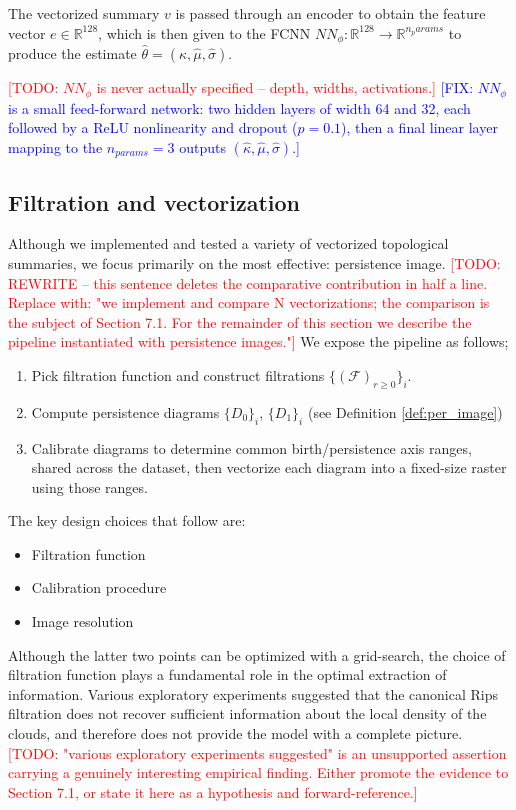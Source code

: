 \documentclass[11pt,letterpaper]{article}
\newcommand{\R}{\mathbb{R}}
\newcommand{\1}{\mathds{1}}
\newcommand{\filt}{\mathcal{F}}
\newcommand{\todo}[1]{\textcolor{red}{[TODO: #1]}}
\newcommand{\fix}[1]{\textcolor{blue}{[FIX: #1]}}
\newcommand{\todo}[1]{}
\newcommand{\fix}[1]{}
\theoremstyle{plain}
\theoremstyle{definitioncolon}
\begin{document}
The vectorized summary $v$ is passed through an encoder to obtain the
feature vector $e \in \R^{128}$, which is then given to the FCNN
$NN_\phi: \R^{128} \to \R^{n_params}$ to produce the estimate
$\hat\theta = (\hat\kappa, \hat\mu, \hat\sigma)$.

\todo{$NN_\phi$ is never actually specified -- depth, widths, activations.}
\fix{$NN_\phi$ is a small feed-forward network: two hidden layers of width 64 and 
32, each followed by a ReLU nonlinearity and dropout ($p=0.1$), then a final 
linear layer mapping to the $n_{params}=3$ outputs $(\hat\kappa, \hat\mu, \hat\sigma)$.}

\subsection{Filtration and vectorization}
Although we implemented and tested a variety of vectorized topological summaries,
we focus primarily on the most effective: persistence image.
\todo{REWRITE -- this sentence deletes the comparative contribution in half a
line. Replace with: "we implement and compare N vectorizations; the comparison
is the subject of Section 7.1. For the remainder of this section we describe the
pipeline instantiated with persistence images."}
We expose the pipeline as follows;
    \begin{enumerate}
        \item Pick filtration function and construct filtrations
        $\{(\filt)_{r\geq 0}\}_i$.
        \item Compute persistence diagrams $\{D_0\}_i$, $\{D_1\}_i$
        (see Definition \ref{def:per_image})
        \item Calibrate diagrams to determine common birth/persistence axis
        ranges, shared across the dataset, then vectorize each diagram into a
        fixed-size raster using those ranges.
    \end{enumerate}
The key design choices that follow are:
    \begin{itemize}
        \item Filtration function
        \item Calibration procedure
        \item Image resolution
    \end{itemize}
Although the latter two points can be optimized with a grid-search, the choice of
filtration function plays a fundamental role in the optimal extraction of
information. Various exploratory experiments suggested that the canonical Rips
filtration does not recover sufficient information about the local density of the
clouds, and therefore does not provide the model with a complete picture.
\todo{"various exploratory experiments suggested" is an unsupported assertion
carrying a genuinely interesting empirical finding. Either promote the evidence
to Section 7.1, or state it here as a hypothesis and forward-reference.}
\end{document}
